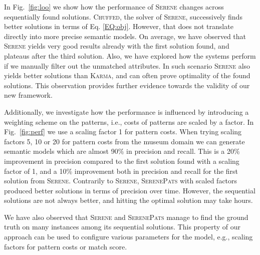 \documentclass[letterpaper]{article} %
\newcommand{\chuffed}{\textsc{Chuffed}}
\newcommand{\karma}{\textsc{Karma}}
\newcommand{\serene}{\textsc{Serene}}
\newcommand{\serenepats}{\textsc{SerenePats}}
\begin{document}
In Fig.~\ref{fig:loo} we show how the performance of \serene{} changes 
across sequentially found solutions.
\chuffed{}, the solver of \serene{}, successively finds better solutions in terms of Eq. \ref{EQ:obj}.
However,
that does not translate directly into more precise semantic models.
On average, we have observed that \serene{} yields very good results already 
with the first solution found, and plateaus after the third solution.
Also, we have explored how the systems perform if we manually filter out the unmatched attributes.
In such scenario \serene{} also yields better solutions than \karma{}, and can often prove optimality of the found solutions.
This observation provides further evidence towards the validity of our new framework.   

Additionally, we investigate how the performance is influenced by introducing 
a weighting scheme on the patterns, i.e., costs of patterns are scaled by a 
factor.
In Fig.~\ref{fig:perf} we use a scaling factor 1 
for pattern costs.
When trying scaling factors 5, 10 or 20 for pattern costs from the museum 
domain we can generate semantic models which 
are almost 90\% in precision and recall.
This is a 20\% improvement in precision compared to the first solution found 
with a scaling factor of 1, and a 10\% improvement both in precision and recall 
for the first solution from \serene{}.
Contrarily to \serene{}, \serenepats{} with scaled factors produced better 
solutions in terms of precision over time.
However, the sequential solutions are not always better, and hitting the 
optimal solution may take hours.

We have also observed that \serene{} and \serenepats{} manage to find the ground truth on 
many instances among its sequential solutions.
This property of our approach can be used to configure various parameters for the model, e.g., scaling factors for pattern costs or match score.


\end{document}
